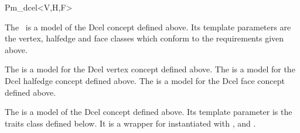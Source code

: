 
\ccRefPageBegin


\begin{ccRefClass}{Pm_dcel<V,H,F>}

\ccDefinition

    The \ccClassTemplateName\ is a model of the Dcel concept
    defined above. Its template parameters are the vertex, halfedge and face
    classes which conform to the requirements given above.


\ccIsModel

The  is a model for the 
Dcel vertex concept defined above. 
The  is a
model for the Dcel halfedge concept defined above.
The  is a
model for the Dcel face concept defined above. 


The  is a model of the Dcel concept
defined above. Its template parameter is the traits class defined below.
It is a wrapper for  instantiated 
with ,
 and 
.


\end{ccRefClass}
\ccRefPageEnd
